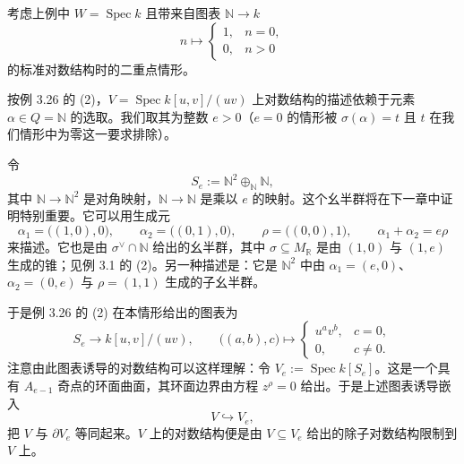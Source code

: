 \begin{example}
考虑上例中 $W=\operatorname{Spec} k$ 且带来自图表 $\mathbb{N}\to k$
\[
  n\longmapsto
  \begin{cases}
    1, & n=0,\\
    0, & n>0
  \end{cases}
\]
的标准对数结构时的二重点情形。

按例 3.26 的 (2)，$V=\operatorname{Spec} k[u,v]/(uv)$ 上对数结构的描述依赖于元素 $\alpha\in Q=\mathbb{N}$ 的选取。我们取其为整数 $e>0$（$e=0$ 的情形被 $\sigma(\alpha)=t$ 且 $t$ 在我们情形中为零这一要求排除）。

令
\[
  S_e:=\mathbb{N}^2\oplus_{\mathbb{N}}\mathbb{N},
\]
其中 $\mathbb{N}\to\mathbb{N}^2$ 是对角映射，$\mathbb{N}\to\mathbb{N}$ 是乘以 $e$ 的映射。这个幺半群将在下一章中证明特别重要。它可以用生成元
\[
  \alpha_1=\bigl((1,0),0\bigr),\qquad
  \alpha_2=\bigl((0,1),0\bigr),\qquad
  \rho=\bigl((0,0),1\bigr),\qquad
  \alpha_1+\alpha_2=e\rho
\]
来描述。它也是由 $\sigma^{\vee}\cap\mathbb{N}$ 给出的幺半群，其中 $\sigma\subseteq M_{\mathbb{R}}$ 是由 $(1,0)$ 与 $(1,e)$ 生成的锥；见例 3.1 的 (2)。另一种描述是：它是 $\mathbb{N}^2$ 中由 $\alpha_1=(e,0)$、$\alpha_2=(0,e)$ 与 $\rho=(1,1)$ 生成的子幺半群。


于是例 3.26 的 (2) 在本情形给出的图表为
\[
  S_e\longrightarrow k[u,v]/(uv),\qquad
  \bigl((a,b),c\bigr)\longmapsto
  \begin{cases}
    u^a v^b, & c=0,\\
    0, & c\neq0.
  \end{cases}
\]
注意由此图表诱导的对数结构可以这样理解：令 $V_e:=\operatorname{Spec} k[S_e]$。这是一个具有 $A_{e-1}$ 奇点的环面曲面，其环面边界由方程 $z^{\rho}=0$ 给出。于是上述图表诱导嵌入
\[
  V\hookrightarrow V_e,
\]
把 $V$ 与 $\partial V_e$ 等同起来。$V$ 上的对数结构便是由 $V\subseteq V_e$ 给出的除子对数结构限制到 $V$ 上。
\end{example}

